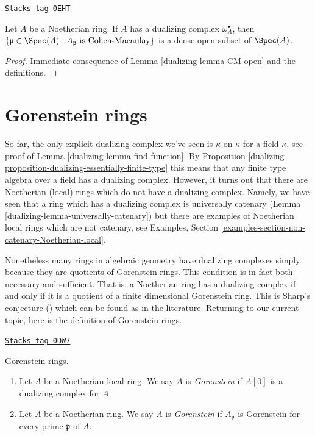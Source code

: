 \begin{lemma}[CM]
\label{dualizing-lemma-CM}
\href{https://stacks.math.columbia.edu/tag/0EHT}{\texttt{Stacks tag 0EHT}}

Let $A$ be a Noetherian ring. If $A$ has a dualizing complex
$\omega_A^\bullet$, then
$\{\mathfrak p \in \Spec(A) \mid A_\mathfrak p\text{ is Cohen-Macaulay}\}$
is a dense open subset of $\Spec(A)$.
\end{lemma}

\begin{proof}

Immediate consequence of Lemma \ref{dualizing-lemma-CM-open} and the definitions.
\end{proof}

\section{Gorenstein rings}
\label{dualizing-section-gorenstein}
So far, the only explicit dualizing complex we've seen is $\kappa$ on $\kappa$
for a field $\kappa$, see proof of Lemma \ref{dualizing-lemma-find-function}.
By Proposition \ref{dualizing-proposition-dualizing-essentially-finite-type}
this means that any finite type algebra over a field has a dualizing
complex. However, it turns out that there are Noetherian (local) rings
which do not have a dualizing complex. Namely, we have seen that
a ring which has a dualizing complex is universally catenary
(Lemma \ref{dualizing-lemma-universally-catenary})
but there are examples of
Noetherian local rings which are not catenary, see
Examples, Section \ref{examples-section-non-catenary-Noetherian-local}.

\medskip\noindent
Nonetheless many rings in algebraic geometry have dualizing complexes
simply because they are quotients of Gorenstein rings. This condition
is in fact both necessary and sufficient. That is: a Noetherian ring
has a dualizing complex if and only if it is a quotient of a finite
dimensional Gorenstein ring. This is Sharp's conjecture (\cite{Sharp})
which can be found as \cite[Corollary 1.4]{Kawasaki} in the literature.
Returning to our current topic, here is the definition of Gorenstein rings.

\begin{definition}[Gorenstein]
\label{dualizing-definition-gorenstein}
\href{https://stacks.math.columbia.edu/tag/0DW7}{\texttt{Stacks tag 0DW7}}

Gorenstein rings.
\begin{enumerate}
\item Let $A$ be a Noetherian local ring. We say $A$ is {\it Gorenstein}
if $A[0]$ is a dualizing complex for $A$.
\item Let $A$ be a Noetherian ring. We say $A$ is {\it Gorenstein}
if $A_\mathfrak p$ is Gorenstein for every prime $\mathfrak p$ of $A$.
\end{enumerate}
\end{definition}

